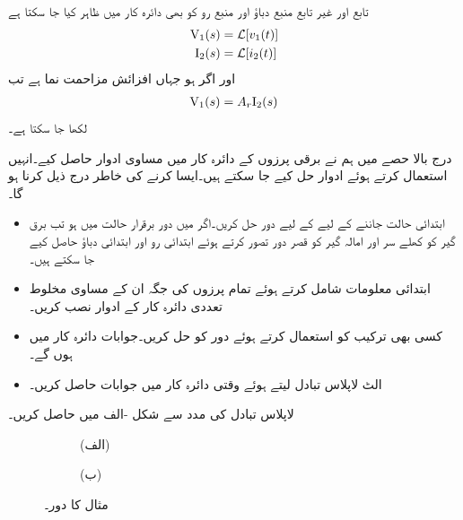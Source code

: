 تابع اور غیر تابع منبع دباؤ اور منبع رو کو بھی  دائرہ کار میں ظاہر کیا جا سکتا ہے
\begin{align}
{\ensuremath{{\textup{V}}}}_1(s)&=\mathcal{L}[v_1(t)]\\
{{\textup{I}}}_2(s)&=\mathcal{L}[i_2(t)]
\end{align}
اور اگر  ہو جہاں  افزائش مزاحمت نما ہے تب 
 \begin{align}
{\ensuremath{{\textup{V}}}}_1(s)=A_r {{\textup{I}}}_2(s)
\end{align}
لکھا جا سکتا ہے۔

درج بالا حصے میں ہم نے برقی پرزوں کے  دائرہ کار میں مساوی ادوار حاصل کیے۔انہیں استعمال کرتے ہوئے ادوار حل کیے جا سکتے ہیں۔ایسا کرنے کی خاطر درج ذیل کرنا ہو گا۔

\begin{itemize}
\item
ابتدائی حالت جاننے کے لیے  کے لیے دور حل کریں۔اگر  میں دور برقرار حالت میں ہو تب برق گیر کو کھلے سر اور امالہ گیر کو قصر دور تصور کرتے ہوئے ابتدائی رو اور ابتدائی دباؤ حاصل کیے جا سکتے ہیں۔
\item
ابتدائی معلومات شامل کرتے ہوئے تمام پرزوں کی جگہ ان کے مساوی مخلوط تعددی دائرہ کار کے ادوار نصب کریں۔
\item
کسی بھی ترکیب کو استعمال کرتے ہوئے دور کو حل کریں۔جوابات  دائرہ کار میں ہوں گے۔
\item
الٹ لاپلاس تبادل لیتے ہوئے وقتی دائرہ کار میں جوابات حاصل کریں۔
\end{itemize}
لاپلاس تبادل کی مدد سے شکل -الف میں  حاصل کریں۔
\begin{figure}
\centering
\begin{subfigure}{0.5\textwidth}
\centering
{}
\caption*{(الف)}
\end{subfigure}%
\begin{subfigure}{0.5\textwidth}
\centering
{}
\caption*{(ب)}
\end{subfigure}%
\caption{مثال  کا دور۔}
\label{شکل_لاپلاس_استعمال_مزاحمت_برق_گیر_الف}
\end{figure}

